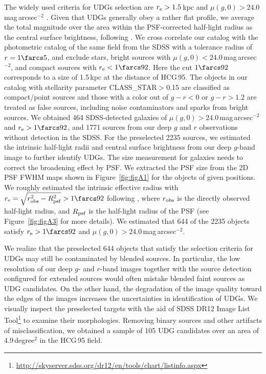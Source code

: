\documentclass[twocolumn,trackchanges]{aastex61}
\begin{document}
The widely used criteria for UDGs selection are $r_{\rm e} > 1.5$\,kpc and $\mu(g,0) > 24.0$\,mag\,arcsec$^{-2}$ \citep{van Dokkum2015a}. Given that UDGs generally obey a rather flat profile, we average the total magnitude over the area within the PSF-corrected half-light radius as the central surface brightness, following \cite{van Dokkum2015a}. We cross correlate our catalog with the photometric catalog of the same field from the SDSS with a tolerance radius of $r=1\farcs5$, and exclude stars, bright sources with $\mu(g,0) < 24.0$\,mag\,arcsec$^{-2}$, and compact sources with $r_{\rm e} < 1\farcs92$.  Here the cut $1\farcs92$ corresponds to a size of 1.5\,kpc at the distance of HCG\,95.   The objects in our catalog with stellarity parameter CLASS\_STAR$>$0.15 are classified as compact/point sources and those with a color out of $g-r<0$ or $g-r>1.2$ are treated as false sources, including noise contaminators and sparks from bright sources.  We obtained 464 SDSS-detected galaxies of  $\mu(g,0) > 24.0$\,mag\,arcsec$^{-2}$ and $r_{\rm e} > 1\farcs92$, and 1771 sources from our deep $g$ and $r$ observations without detection in the SDSS.  
For the preselected 2235 sources, we estimated the intrinsic half-light radii and central surface brightness from our deep $g$-band image to further identify UDGs. 
%
The size measurement for galaxies needs to correct the broadening effect by PSF. We extracted the PSF size from the 2D PSF FWHM maps shown in Figure~\ref{fig:figA1} for the objects of given positions.  We roughly estimated the intrinsic effective radius with $ r_{\rm e} = \sqrt{ r_{\rm obs}^{2}- R_{\rm psf}^{2}} > 1\farcs92$ following \cite{Bouche2015}, where $ r_{\rm obs}$ is the directly observed half-light radius, and $R_{\rm psf}$ is the half-light radius of the PSF (see Figure~\ref{fig:figA3} for more details).  
We estimated that 644 of the 2235 objects satisfy $r_{\rm e} > 1\farcs92$ and $\mu(g,0) > 24.0$\,mag\,arcsec$^{-2}$. 


We realize that the preselected 644 objects that satisfy the selection criteria for UDGs may still be contaminated by blended sources. In particular, the low resolution of our deep $g$- and $r$-band images together with the source detection configured for extended sources would often mistake blended faint sources as UDG candidates. On the other hand, the degradation of the image quality toward the edges of the images increases the uncertainties in identification of UDGs.   
We visually inspect the preselected targets with the aid of SDSS DR12 Image List Tool\footnote{\url{http://skyserver.sdss.org/dr12/en/tools/chart/listinfo.aspx}} to examine their morphologies. 
%
Removing binary sources and other artifacts of misclassification, we obtained a sample of 105 UDG candidates over an area of 4.9\,degree$^2$ in the HCG\,95 field. 
\end{document}
